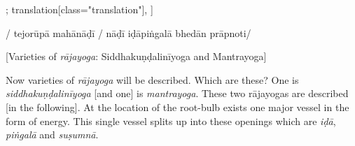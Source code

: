 \documentclass[12pt]{article}%
\def\om{\textrm{\foreignlanguage{english}{\footnotesize omitted in\ }}} %
\begin{document}
\begin{alignment}[
    texts=edition[class="edition"];
    translation[class="translation"],
  ]
\begin{edition}
\begin{prose}
       /
       tejorūpā mahānāḍī
       /
nāḍī iḍāpiṅgalā
  bhedān prāpnoti/\end{prose}
    \end{edition}
    \begin{translation}
        \bigskip
    \centerline{\textrm{\small{[Varieties of \textit{rājayoga}: Siddhakuṇḍalinīyoga and Mantrayoga]}}}
    \bigskip
    \begin{tlate}Now varieties of \textit{rājayoga} will be described. Which are these? One is \textit{siddhakuṇḍalinīyoga} [and one] is \textit{mantrayoga}. These two rājayogas are described [in the following]. At the location of the root-bulb exists one major vessel in the form of energy. This single vessel splits up into these openings which are \textit{iḍā}, \textit{piṅgalā} and \textit{suṣumnā}. \end{tlate}

\end{translation}
\end{alignment}
\end{document}
